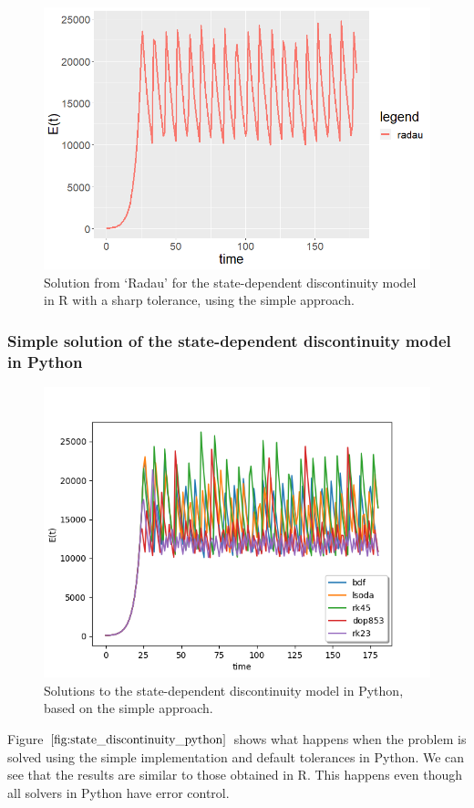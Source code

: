 \begin{figure}[H]
\centering
\includegraphics[width=0.7\linewidth]{./figures/state_discontinuity_sharp_radau_R}
\caption{Solution from `Radau' for the state-dependent discontinuity model in R with a sharp tolerance, using the simple approach.}
\label{fig:state_discontinuity_radau_sharp_R}
\end{figure}

\subsubsection{Simple solution of the state-dependent discontinuity model in Python}
\begin{figure}[H]
\centering
\includegraphics[width=0.7\linewidth]{./figures/state_discontinuity_py}
\caption{Solutions to the state-dependent discontinuity model in Python, based on the simple approach.}
\label{fig:state_discontinuity_python}
\end{figure}
Figure $\ref{fig:state_discontinuity_python}$ shows what happens when the problem is solved using the simple implementation and default tolerances in Python. We can see that the results are similar to those obtained in R. This happens even though all solvers in Python have error control.

